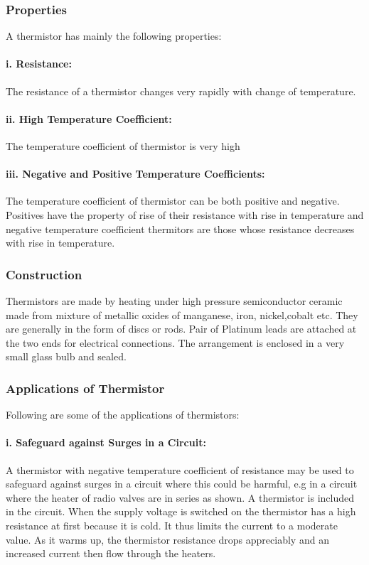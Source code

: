 \subsubsection{Properties}
A thermistor has mainly the following properties:
\paragraph{i. Resistance:}
The resistance of a thermistor changes very rapidly with change of temperature.
\paragraph{ii. High Temperature Coefficient:}
The temperature coefficient of thermistor is very high
\paragraph{iii. Negative and Positive Temperature Coefficients:}
The temperature coefficient of thermistor can be both positive and negative. Positives have the property of rise of their resistance with rise in temperature and negative temperature coefficient thermitors are those whose resistance decreases with rise in temperature.
\subsubsection{Construction}
Thermistors are made by heating under high pressure semiconductor ceramic made from mixture of metallic oxides of manganese, iron, nickel,cobalt etc. They are generally in the form of discs or rods. Pair of Platinum leads are attached at the two ends for electrical connections. The arrangement is enclosed in a very small glass bulb and sealed.
\subsubsection{Applications of Thermistor}
Following are some of the applications of thermistors:
\paragraph{i. Safeguard against Surges in a Circuit:}
A thermistor with negative temperature coefficient of resistance may be used to safeguard against surges in a circuit where this could be harmful, e.g in a circuit where the heater of radio valves are in series as shown.
A thermistor is included in the circuit. When the supply voltage is switched on the thermistor has a high resistance at first because it is cold. It thus limits the current to a moderate value. As it warms up, the thermistor resistance drops appreciably and an increased current then flow through the heaters.
